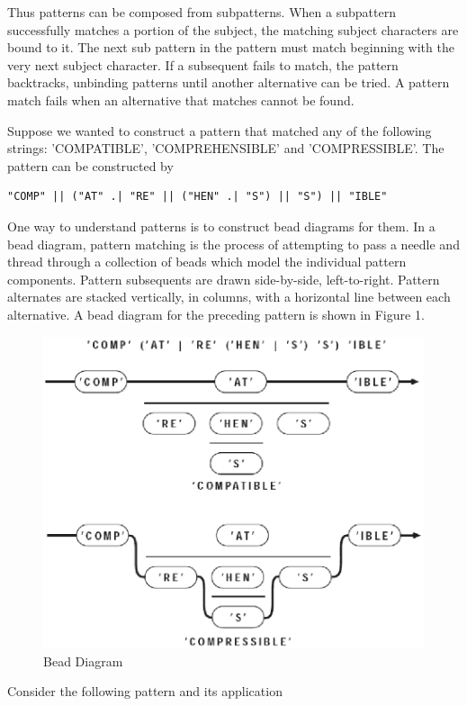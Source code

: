 \documentclass[letterpaper,12pt]{article}
\begin{document}
Thus patterns can be composed from subpatterns. When a subpattern
successfully matches a portion of the subject, the matching subject
characters are bound to it. The next sub pattern in the pattern must
match beginning with the very next subject character. If a subsequent
fails to match, the pattern backtracks, unbinding patterns until
another alternative can be tried. A pattern match fails when an
alternative that matches cannot be found.

Suppose we wanted to construct a pattern that matched any of the
following strings: 'COMPATIBLE', 'COMPREHENSIBLE' and
'COMPRESSIBLE'. The pattern can be constructed by

\begin{verbatim}
"COMP" || ("AT" .| "RE" || ("HEN" .| "S") || "S") || "IBLE"
\end{verbatim}

One way to understand patterns is to construct bead diagrams for
them. In a bead diagram, pattern matching is the process of attempting
to pass a needle and thread through a collection of beads which model
the individual pattern components. Pattern subsequents are drawn
side-by-side, left-to-right. Pattern alternates are stacked
vertically, in columns, with a horizontal line between each
alternative.  A bead diagram for the preceding pattern is shown
in Figure 1.
\begin{figure}[h]
\centering
\includegraphics[width=4.9in]{beaddia.png}
\caption{Bead Diagram}
\end{figure}

Consider the following pattern and its application
\end{document}
